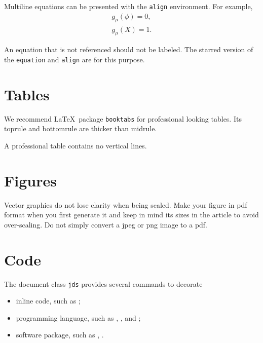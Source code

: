 \documentclass[letterpaper,inpress]{jdsart}
\begin{document}
Multiline equations can be presented with the \texttt{align}
environment. For example,
\begin{align*}
  g_{\mu}(\phi) = 0,\\
  g_{\mu}(X) = 1.
\end{align*}

An equation that is not referenced should not be labeled. The starred
version of the \texttt{equation} and \texttt{align} are for this purpose.

\hypertarget{tables}{%
\section{Tables}\label{tables}}

We recommend \LaTeX~package \texttt{booktabs} for professional
looking tables. Its toprule and bottomrule are thicker than midrule.

A professional table contains no vertical lines.

\hypertarget{figures}{%
\section{Figures}\label{figures}}

Vector graphics do not lose clarity when being scaled. Make your
figure in pdf format when you first generate it and keep in mind its
sizes in the article to avoid over-scaling. Do not simply convert a
jpeg or png image to a pdf.

\hypertarget{code}{%
\section{Code}\label{code}}

The document class \texttt{jds} provides several commands to decorate

\begin{itemize}
\item inline code, such as ;
\item programming language, such as , , and
  ;
\item software package, such as , .
\end{itemize}
\end{document}
